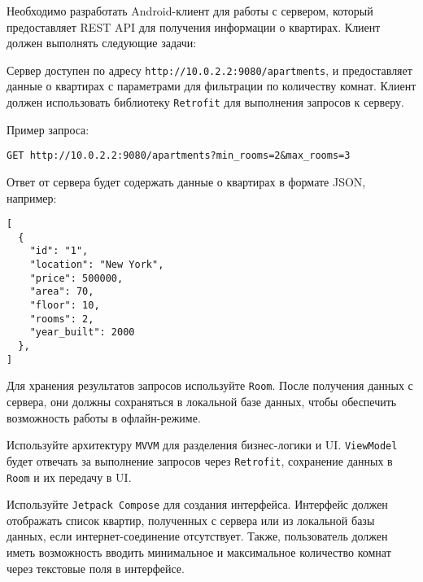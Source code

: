 
Необходимо разработать Android-клиент для работы с сервером, который предоставляет REST API для получения информации о квартирах. Клиент должен выполнять следующие задачи:

Сервер доступен по адресу \texttt{http://10.0.2.2:9080/apartments}, и предоставляет данные о квартирах с параметрами для фильтрации по количеству комнат. Клиент должен использовать библиотеку \texttt{Retrofit} для выполнения запросов к серверу.

Пример запроса:
\begin{verbatim}
GET http://10.0.2.2:9080/apartments?min_rooms=2&max_rooms=3
\end{verbatim}

Ответ от сервера будет содержать данные о квартирах в формате JSON, например:

\begin{verbatim}
[
  {
    "id": "1",
    "location": "New York",
    "price": 500000,
    "area": 70,
    "floor": 10,
    "rooms": 2,
    "year_built": 2000
  },
]
\end{verbatim}

Для хранения результатов запросов используйте \texttt{Room}. 
После получения данных с сервера, они должны сохраняться в локальной базе данных, 
чтобы обеспечить возможность работы в офлайн-режиме. 

Используйте архитектуру \texttt{MVVM} для разделения бизнес-логики и UI. \texttt{ViewModel} будет отвечать за выполнение запросов через \texttt{Retrofit}, сохранение данных в \texttt{Room} и их передачу в UI.

Используйте \texttt{Jetpack Compose} для создания интерфейса. Интерфейс должен отображать список квартир, полученных с сервера или из локальной базы данных, если интернет-соединение отсутствует. Также, пользователь должен иметь возможность вводить минимальное и максимальное количество комнат через текстовые поля в интерфейсе.

